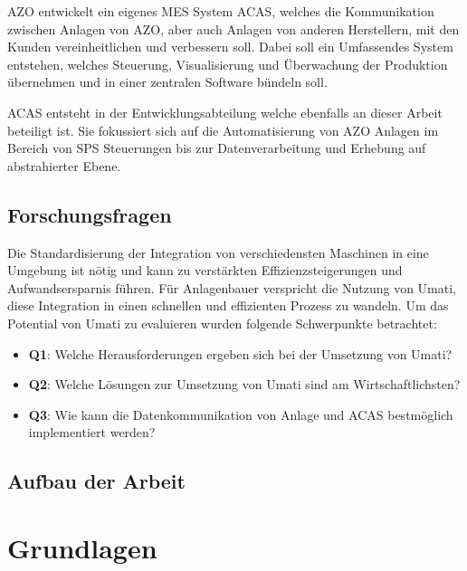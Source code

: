 \documentclass[a4paper, 12pt, oneside]{scrbook}
\begin{document}
	 AZO entwickelt ein eigenes MES System ACAS, welches die Kommunikation zwischen Anlagen von AZO, aber auch Anlagen von anderen Herstellern, mit den Kunden vereinheitlichen und verbessern soll. Dabei soll ein Umfassendes System entstehen, welches Steuerung, Visualisierung und Überwachung der Produktion übernehmen und in einer zentralen Software bündeln soll.
	
	 ACAS entsteht in der Entwicklungsabteilung welche ebenfalls an dieser Arbeit beteiligt ist. Sie fokussiert sich auf die Automatisierung von AZO Anlagen im Bereich von SPS Steuerungen bis zur Datenverarbeitung und Erhebung auf abstrahierter Ebene. 
	
	
	\section{Forschungsfragen}
	
	Die Standardisierung der Integration von verschiedensten Maschinen in eine Umgebung ist nötig und kann zu verstärkten Effizienzsteigerungen und Aufwandsersparnis führen. Für Anlagenbauer verspricht die Nutzung von Umati, diese Integration in einen schnellen und effizienten Prozess zu wandeln. Um das Potential von Umati zu evaluieren wurden folgende Schwerpunkte betrachtet:
	
	\begin{itemize}
		\item \textbf{Q1}: Welche Herausforderungen ergeben sich bei der Umsetzung von Umati?
		\item \textbf{Q2}: Welche Lösungen zur Umsetzung von Umati sind am Wirtschaftlichsten?
		\item \textbf{Q3}: Wie kann die Datenkommunikation von Anlage und ACAS bestmöglich implementiert werden?
	\end{itemize}
	
	\section{Aufbau der Arbeit}
	
	
\chapter{Grundlagen}
	
\end{document}
